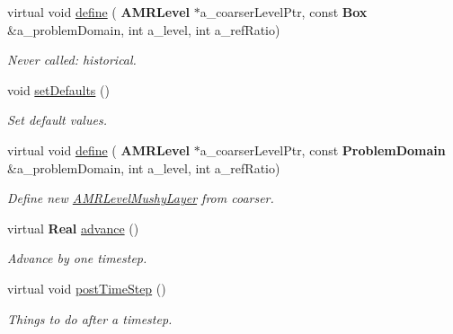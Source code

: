 \begin{DoxyCompactItemize}
\mbox{\label{class_a_m_r_level_mushy_layer_a4520425f77deb76db6fd3eb789e4c68b}} 
virtual void \hyperlink{class_a_m_r_level_mushy_layer_a4520425f77deb76db6fd3eb789e4c68b}{define} (\textbf{ A\+M\+R\+Level} $\ast$a\+\_\+coarser\+Level\+Ptr, const \textbf{ Box} \&a\+\_\+problem\+Domain, int a\+\_\+level, int a\+\_\+ref\+Ratio)
\begin{DoxyCompactList}\small\item\em Never called\+: historical. \end{DoxyCompactList}\item 
void \hyperlink{class_a_m_r_level_mushy_layer_ad9766575f35a8fc27568ad7dde975eec}{set\+Defaults} ()
\begin{DoxyCompactList}\small\item\em Set default values. \end{DoxyCompactList}\item 
virtual void \hyperlink{class_a_m_r_level_mushy_layer_a1ed163b80b24d3dc053097d24dc55be5}{define} (\textbf{ A\+M\+R\+Level} $\ast$a\+\_\+coarser\+Level\+Ptr, const \textbf{ Problem\+Domain} \&a\+\_\+problem\+Domain, int a\+\_\+level, int a\+\_\+ref\+Ratio)
\begin{DoxyCompactList}\small\item\em Define new \hyperlink{class_a_m_r_level_mushy_layer}{A\+M\+R\+Level\+Mushy\+Layer} from coarser. \end{DoxyCompactList}\item 
\mbox{\label{class_a_m_r_level_mushy_layer_aa303a6233d0a9cf8701035e98e6d028d}} 
virtual \textbf{ Real} \hyperlink{class_a_m_r_level_mushy_layer_aa303a6233d0a9cf8701035e98e6d028d}{advance} ()
\begin{DoxyCompactList}\small\item\em Advance by one timestep. \end{DoxyCompactList}\item 
\mbox{\label{class_a_m_r_level_mushy_layer_a9c9c444cc77e9f623ddc9132ee4bc532}} 
virtual void \hyperlink{class_a_m_r_level_mushy_layer_a9c9c444cc77e9f623ddc9132ee4bc532}{post\+Time\+Step} ()
\begin{DoxyCompactList}\small\item\em Things to do after a timestep. \end{DoxyCompactList}\item 

\end{DoxyCompactItemize}
